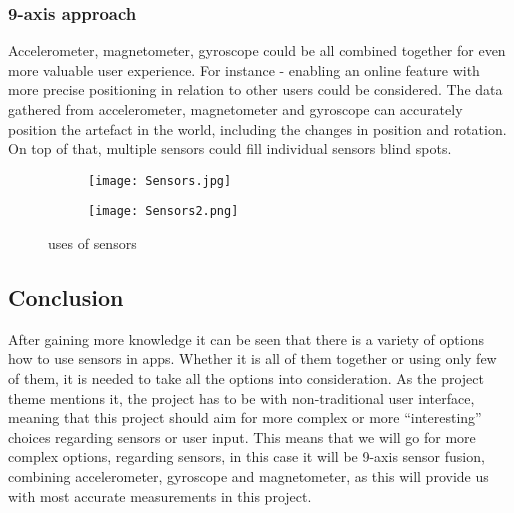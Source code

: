\subsubsection*{9-axis approach}
Accelerometer, magnetometer, gyroscope could be all combined together for even more valuable user experience. For instance - enabling an online feature with more precise positioning in relation to other users could be considered. The data gathered from accelerometer, magnetometer and gyroscope can accurately position the artefact in the world, including the changes in position and rotation. On top of that, multiple sensors could fill individual sensors blind spots. 

\begin{figure}[H]
\begin{subfigure}{.5\textwidth}
  \centering
  \texttt{[image: Sensors.jpg]}
\end{subfigure}%
\begin{subfigure}{.5\textwidth}
  \centering
  \texttt{[image: Sensors2.png]}
\end{subfigure}
\caption{uses of sensors}
\end{figure}


\subsection{Conclusion}
After gaining more knowledge it can be seen that there is a variety of options how to use sensors in apps. Whether it is all of them together or using only few of them, it is needed to take all the options into consideration. As the project theme mentions it, the project has to be with non-traditional user interface, meaning that this project should aim for more complex or more “interesting” choices regarding sensors or user input. This means that we will go for more complex options, regarding sensors, in this case it will be 9-axis sensor fusion, combining accelerometer, gyroscope and magnetometer, as this will provide us with most accurate measurements in this project.


